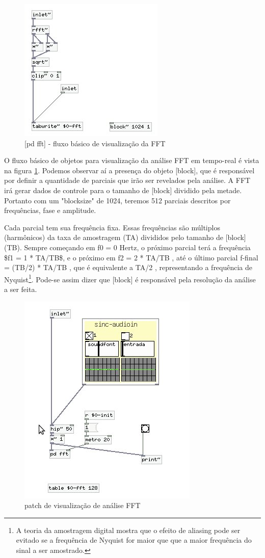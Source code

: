 \documentclass{ppgmus}
\begin{document}
\begin{figure}
\includegraphics[scale=.6]{fft-subpatch}
\caption{[pd fft] - fluxo básico de visualização da FFT}
\label{fft-subpatch}
\end{figure}  

O fluxo básico de objetos para visualização da análise FFT em tempo-real é vista na
figura \ref{fft-subpatch}. Podemos observar aí a presença do objeto [block\texttildelow], que é
responsável por definir a quantidade de parciais que irão ser revelados pela
análise. A FFT irá gerar dados de controle para o tamanho de [block\texttildelow] dividido
pela metade. Portanto com um "blocksize" de 1024, teremos 512 parciais descritos
por frequências, fase e amplitude.

Cada parcial tem sua frequência fixa. Essas frequências são múltiplos (harmônicos)
da taxa de amostragem (TA) divididos pelo tamanho de [block\texttildelow] (TB). Sempre começando
em f0 = 0 Hertz, o próximo parcial terá a frequência \$f1 = 1 * TA/TB\$, e o próximo em 
f2 = 2 * TA/TB , até o último parcial f-final = (TB/2) * TA/TB , que é equivalente a
TA/2 , representando a frequência de Nyquist\footnote{A teoria da amostragem digital
mostra que o efeito de aliasing pode ser evitado se a frequência de Nyquist for maior que
que a maior frequência do sinal a ser amostrado.}. Pode-se assim dizer que [block\texttildelow]
é responsável pela resolução da análise a ser feita.

\begin{figure}
\includegraphics[scale=.6]{fft-geral}
\caption{patch de visualização de análise FFT}
\label{fft-geral}
\end{figure}  
\end{document}
